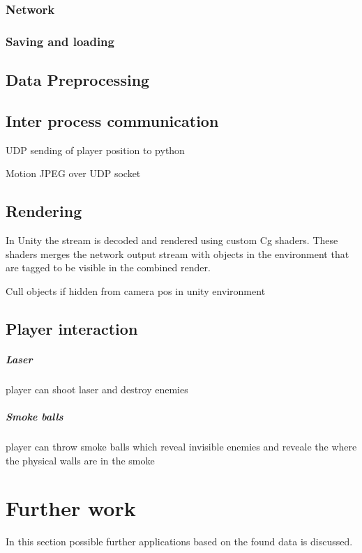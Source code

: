 \documentclass[a4paper, twoside, 10pt]{report}
\begin{document}
\subsection{Network} \label{Network}


\subsection{Saving and loading}
\section{Data Preprocessing}
\section{Inter process communication}
UDP sending of player position to python

Motion JPEG over UDP socket 

\section{Rendering}
In Unity the stream is decoded and rendered using custom Cg shaders. These shaders merges the network output stream with objects in the environment that are tagged to be visible in the combined render.

Cull objects if hidden from camera pos in unity environment

\section{Player interaction}
\paragraph{Laser}
player can shoot laser and destroy enemies

\paragraph{Smoke balls}
player can throw smoke balls which reveal invisible enemies and reveale the where the physical walls are in the smoke




\chapter{Further work}
In this section possible further applications based on the found data is discussed.
\end{document}
